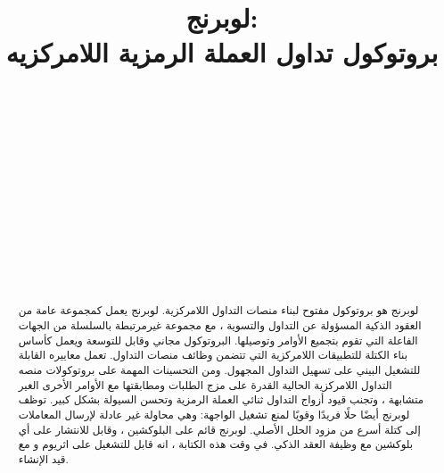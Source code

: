 \documentclass[12pt, a4paper, leqno]{report}
\title{\textbf{لوبرنج:}\\\textbf{بروتوكول تداول العملة الرمزية اللامركزيه}}
\author{
  \textRL{دانيال وانج}\\
  \texttt{\textLR{daniel@loopring.org}}\\
  \and
  	\textRL{جي زهو}\\
  	\texttt{\textLR{jay@loopring.org}}\\
  	\and
  	\textRL{أليكس وانج}\\
  	\texttt{\textLR{alex@loopring.org}}\\
  	\and
  	\textRL{ماثيو فينيستون}\\
  	\texttt{\textLR{matt.finestone@gmail.com}}\\ 
  \\
  \texttt{\textLR{https://loopring.org}}
 }
\theoremstyle{plain}
\theoremstyle{definition}
\begin{document}
 \maketitle
 
\begin{abstract}
\begin{otherlanguage}{arabic}
لوبرنج هو بروتوكول مفتوح لبناء منصات التداول اللامركزية. لوبرنج  يعمل كمجموعة عامة من العقود الذكية المسؤولة عن التداول والتسوية ، مع مجموعة غيرمرتبطة بالسلسلة من الجهات الفاعلة التي تقوم بتجميع الأوامر وتوصيلها. البروتوكول مجاني وقابل للتوسعة ويعمل كأساس بناء الكتلة  للتطبيقات اللامركزية  التي تتضمن وظائف منصات التداول. تعمل معاييره القابلة للتشغيل البيني على تسهيل التداول المجهول. ومن التحسينات المهمة على بروتوكولات منصه التداول اللامركزية الحالية القدرة على مزج الطلبات ومطابقتها مع الأوامر الأخرى الغير متشابهة ، وتجنب قيود أزواج التداول ثنائي العملة الرمزية وتحسن السيولة بشكل كبير. توظف لوبرنج أيضًا حلًا فريدًا وقويًا لمنع تشغيل الواجهة: وهي محاولة غير عادلة لإرسال المعاملات إلى كتلة أسرع من مزود الحلل الأصلي. لوبرنج  قائم على البلوكشين ، وقابل للانتشار على أي بلوكشين مع وظيفة العقد الذكي. في وقت هذه الكتابة ، انه قابل للتشغيل على اثريوم  و  مع  قيد الإنشاء.
\end{otherlanguage}
\end{abstract}


\end{document}
